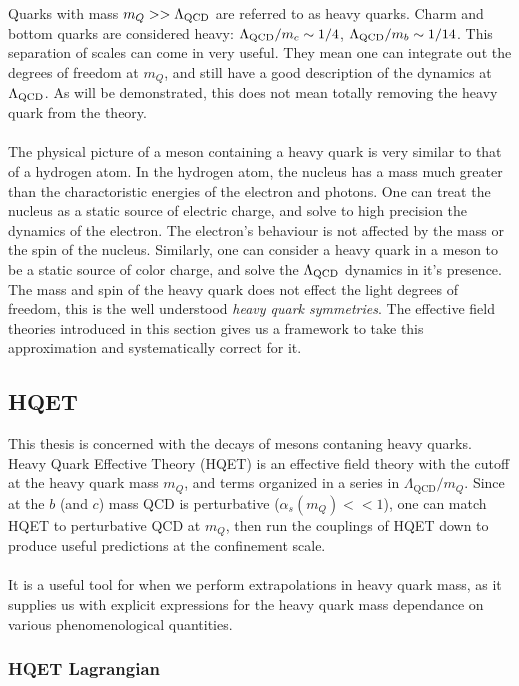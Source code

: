Quarks with mass $m_Q >> \Lambda_{\text{QCD}}$ are referred to as heavy quarks. Charm and bottom quarks are considered heavy: $\Lambda_{\text{QCD}}/m_c \sim 1/4$, $\Lambda_{\text{QCD}}/m_b \sim 1/14$. This separation of scales can come in very useful. They mean one can integrate out the degrees of freedom at $m_Q$, and still have a good description of the dynamics at $\Lambda_{\text{QCD}}$. As will be demonstrated, this does not mean totally removing the heavy quark from the theory.
\\ \\
The physical picture of a meson containing a heavy quark is very similar to that of a hydrogen atom. In the hydrogen atom, the nucleus has a mass much greater than the charactoristic energies of the electron and photons. One can treat the nucleus as a static source of electric charge, and solve to high precision the dynamics of the electron. The electron's behaviour is not affected by the mass or the spin of the nucleus. Similarly, one can consider a heavy quark in a meson to be a static source of color charge, and solve the $\Lambda_{\text{QCD}}$ dynamics in it's presence. The mass and spin of the heavy quark does not effect the light degrees of freedom, this is the well understood {\it{heavy quark symmetries}}. The effective field theories introduced in this section gives us a framework to take this approximation and systematically correct for it.

\subsection{HQET}

This thesis is concerned with the decays of mesons contaning heavy quarks. Heavy Quark Effective Theory (HQET) is an effective field theory with the cutoff at the heavy quark mass $m_Q$, and terms organized in a series in $\Lambda_{\text{QCD}}/m_Q$. Since at the $b$ (and $c$) mass QCD is perturbative ($\alpha_s(m_Q) << 1$), one can match HQET to perturbative QCD at $m_Q$, then run the couplings of HQET down to produce useful predictions at the confinement scale.
\\ \\
It is a useful tool for when we perform extrapolations in heavy quark mass, as it supplies us with explicit expressions for the heavy quark mass dependance on various phenomenological quantities.

\subsubsection{HQET Lagrangian}

